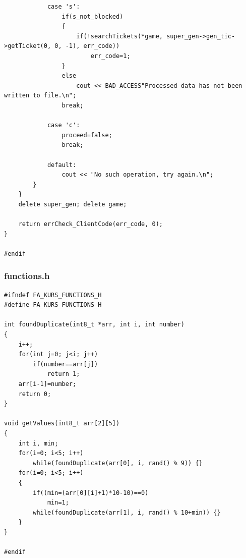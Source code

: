 \documentclass[a4paper,14pt]{article}
\begin{document}
\begin{verbatim}
            case 's':
                if(s_not_blocked)
                {
                    if(!searchTickets(*game, super_gen->gen_tic->getTicket(0, 0, -1), err_code))
                        err_code=1;
                }
                else
                    cout << BAD_ACCESS"Processed data has not been written to file.\n";
                break;

            case 'c':
                proceed=false;
                break;

            default:
                cout << "No such operation, try again.\n";
        }
    }
    delete super_gen; delete game;

    return errCheck_ClientCode(err_code, 0);
}

#endif

\end{verbatim}
\subsubsection{functions.h}
\begin{verbatim}
#ifndef FA_KURS_FUNCTIONS_H
#define FA_KURS_FUNCTIONS_H

int foundDuplicate(int8_t *arr, int i, int number)
{
    i++;
    for(int j=0; j<i; j++)
        if(number==arr[j])
            return 1;
    arr[i-1]=number;
    return 0;
}

void getValues(int8_t arr[2][5])
{
    int i, min;
    for(i=0; i<5; i++)
        while(foundDuplicate(arr[0], i, rand() % 9)) {}
    for(i=0; i<5; i++)
    {
        if((min=(arr[0][i]+1)*10-10)==0)
            min=1;
        while(foundDuplicate(arr[1], i, rand() % 10+min)) {}
    }
}

#endif

\end{verbatim}
\end{document}
